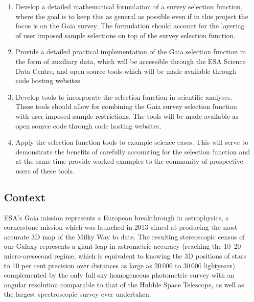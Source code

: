 \begin{enumerate}
    \item Develop a detailed mathematical formulation of a survey selection function, where the goal is to keep this
        as general as possible even if in this project the focus is on the Gaia survey. The formulation should account
        for the layering of user imposed sample selections on top of the survey selection function.
    \item Provide a detailed practical implementation of the Gaia selection function in the form of auxiliary data,
        which will be accessible through the ESA Science Data Centre, and open source tools which will be made available through
        code hosting websites. 
    \item Develop tools to incorporate the selection function in scientific analyses. These tools should allow for
        combining the Gaia survey selection function with user imposed sample restrictions. The tools will be made
        available as open source code through code hosting websites.
    \item Apply the selection function tools to example science cases. This will serve to demonstrate the benefits of
        carefully accounting for the selection function and at the same time provide worked examples to the community of
        prospective users of these tools.
\end{enumerate}

\subsection{Context}
\label{sec:context}

ESA's Gaia mission \cite{2016A&A...595A...1G} represents a European breakthrough in astrophysics, a cornerstone
mission which was launched in 2013 aimed at producing the most accurate 3D map of the Milky Way to date. The resulting
stereoscopic census of our Galaxy represents a giant leap in astrometric accuracy (reaching the 10--20 micro-arcsecond
regime, which is equivalent to knowing the 3D positions of stars to 10 per cent precision over distances as large as $20\,000$ to $30\,000$ lightyears) complemented by the only full sky homogeneous photometric survey with an angular resolution comparable to that
of the Hubble Space Telescope, as well as the largest spectroscopic survey ever undertaken. 

